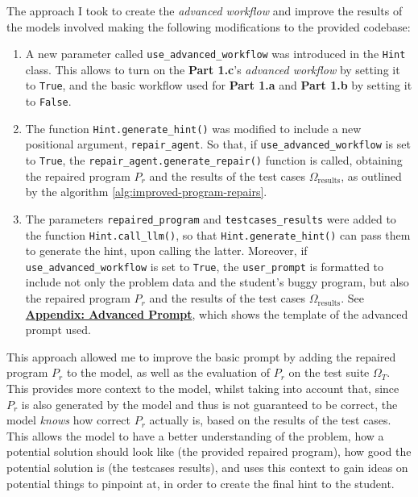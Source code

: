 \documentclass{article}
\begin{document}
The approach I took to create the \textit{advanced workflow} and improve the results of the models involved making the following modifications to the provided codebase:

\begin{enumerate}
    \item A new parameter called \texttt{use\_advanced\_workflow} was introduced in the \texttt{Hint} class. This allows to turn on the \textbf{Part 1.c}'s \textit{advanced workflow} by setting it to \texttt{True}, and the basic workflow used for \textbf{Part 1.a} and \textbf{Part 1.b} by setting it to \texttt{False}.
    \item The function \texttt{Hint.generate\_hint()} was modified to include a new positional argument, \texttt{repair\_agent}. So that, if \texttt{use\_advanced\_workflow} is set to \texttt{True}, the \texttt{repair\_agent.generate\_repair()} function is called, obtaining the repaired program $P_r$ and the results of the test cases $\Omega_{\text{results}}$, as outlined by the algorithm \ref{alg:improved-program-repairs}. 
    \item The parameters \texttt{repaired\_program} and \texttt{testcases\_results} were added to the function \texttt{Hint.call\_llm()}, so that \texttt{Hint.generate\_hint()} can pass them to generate the hint, upon calling the latter. Moreover, if \texttt{use\_advanced\_workflow} is set to \texttt{True}, the \texttt{user\_prompt} is formatted to include not only the problem data and the student's buggy program, but also the repaired program $P_r$ and the results of the test cases $\Omega_{\text{results}}$. See \hyperref[appendix:advanced-prompt]{\textbf{Appendix: Advanced Prompt}}, which shows the template of the advanced prompt used.
\end{enumerate}

This approach allowed me to improve the basic prompt by adding the repaired program $P_r$ to the model, as well as the evaluation of $P_r$ on the test suite $\Omega_T$. This provides more context to the model, whilst taking into account that, since $P_r$ is also generated by the model and thus is not guaranteed to be correct, the model \textit{knows} how correct $P_r$ actually is, based on the results of the test cases. This allows the model to have a better understanding of the problem, how a potential solution should look like (the provided repaired program), how good the potential solution is (the testcases results), and uses this context to gain ideas on potential things to pinpoint at, in order to create the final hint to the student.
\end{document}

